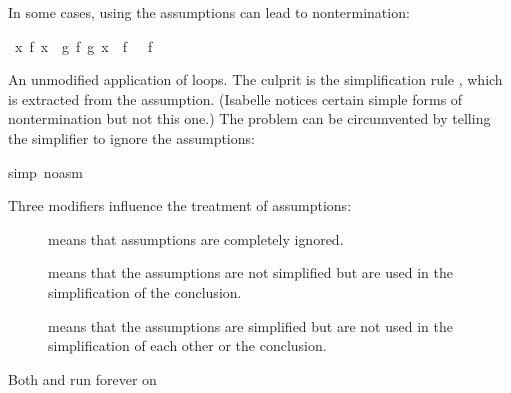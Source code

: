 \begin{isabellebody}
\begin{isamarkuptext}
In some cases, using the assumptions can lead to nontermination:%
\end{isamarkuptext}%
\isamarkuptrue%
\isamarkupfalse%
\ {\isachardoublequoteopen}{\isasymforall}x{\isachardot}\ f\ x\ {\isacharequal}\ g\ {\isacharparenleft}f\ {\isacharparenleft}g\ x{\isacharparenright}{\isacharparenright}\ {\isasymLongrightarrow}\ f\ {\isacharbrackleft}{\isacharbrackright}\ {\isacharequal}\ f\ {\isacharbrackleft}{\isacharbrackright}\ {\isacharat}\ {\isacharbrackleft}{\isacharbrackright}{\isachardoublequoteclose}%
\isadelimproof
%
\endisadelimproof
%
\isatagproof
%
\begin{isamarkuptxt}%
\noindent
An unmodified application of  loops.  The culprit is the
simplification rule , which is extracted from
the assumption.  (Isabelle notices certain simple forms of
nontermination but not this one.)  The problem can be circumvented by
telling the simplifier to ignore the assumptions:%
\end{isamarkuptxt}%
\isamarkuptrue%
\isamarkupfalse%
{\isacharparenleft}simp\ {\isacharparenleft}no{\isacharunderscore}asm{\isacharparenright}{\isacharparenright}\isanewline
{}\isamarkupfalse%
%
\endisatagproof
{\isafoldproof}%
%
\isadelimproof
%
\endisadelimproof
%
\begin{isamarkuptext}%
\noindent
Three modifiers influence the treatment of assumptions:
\begin{description}
\item[]
 means that assumptions are completely ignored.
\item[]
 means that the assumptions are not simplified but
  are used in the simplification of the conclusion.
\item[]
 means that the assumptions are simplified but are not
  used in the simplification of each other or the conclusion.
\end{description}
Both  and  run forever on

\end{isamarkuptext}
\end{isabellebody}
